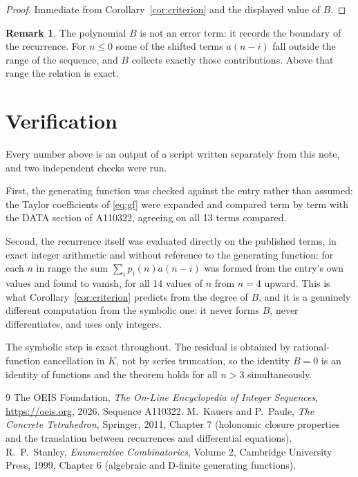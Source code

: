 \documentclass[11pt,a4paper]{article}
\theoremstyle{plain}
\theoremstyle{definition}
\newtheorem{remark}[theorem]{Remark}
\begin{document}
\begin{proof}
Immediate from Corollary~\ref{cor:criterion} and the displayed value of $B$.
\end{proof}

\begin{remark}
The polynomial $B$ is not an error term: it records the boundary of the recurrence. For
$n\le0$ some of the shifted terms $a(n-i)$ fall outside the range of the sequence,
and $B$ collects exactly those contributions. Above that range the relation is exact.
\end{remark}

\section{Verification}

Every number above is an output of a script written separately from this note, and two
independent checks were run.

First, the generating function was checked against the entry rather than assumed: the
Taylor coefficients of \eqref{eq:gf} were expanded and compared term by term with the DATA
section of A110322, agreeing on all 13 terms compared.

Second, the recurrence itself was evaluated directly on the published terms, in exact
integer arithmetic and without reference to the generating function: for each $n$ in range
the sum $\sum_{i}p_{i}(n)a(n-i)$ was formed from the entry's own values and found to
vanish, for all 14 values of $n$ from $n=4$ upward. This is what
Corollary~\ref{cor:criterion} predicts from the degree of $B$, and it is a genuinely
different computation from the symbolic one: it never forms $B$, never differentiates, and
uses only integers.

The symbolic step is exact throughout. The residual is obtained by rational-function
cancellation in $K$, not by series truncation, so the identity $B=0$ is an
identity of functions and the theorem holds for all $n>3$ simultaneously.

\begin{thebibliography}{9}
 The OEIS Foundation, \emph{The On-Line Encyclopedia of Integer Sequences},
\url{https://oeis.org}, 2026. Sequence A110322.
 M.~Kauers and P.~Paule, \emph{The Concrete Tetrahedron}, Springer, 2011,
Chapter 7 (holonomic closure properties and the translation between recurrences and
differential equations).
 R.~P.~Stanley, \emph{Enumerative Combinatorics}, Volume 2, Cambridge
University Press, 1999, Chapter 6 (algebraic and D-finite generating functions).
\end{thebibliography}
\end{document}
